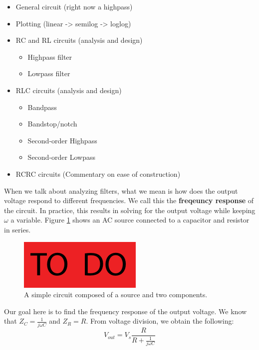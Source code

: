 \begin{itemize}
\item General circuit (right now a highpass)
\item Plotting (linear -> semilog -> loglog)
\item RC and RL circuits (analysis and design)
\begin{itemize}
\item Highpass filter
\item Lowpass filter
\end{itemize}
\item RLC circuits (analysis and design)
\begin{itemize}
\item Bandpass
\item Bandstop/notch
\item Second-order Highpass
\item Second-order Lowpass
\end{itemize}
\item RCRC circuits (Commentary on ease of construction)
\end{itemize}


When we talk about analyzing filters, what we mean is how does the output voltage respond to different frequencies.  We call this the {\bf freqeuncy response} of the circuit.  In practice, this results in solving for the output voltage while keeping $\omega$ a variable.  Figure \ref{fig:CircuitRC} shows an AC source connected to a capacitor and resistor in series.

\begin{figure}
   \centering
  \includegraphics{figures/toDo}
  \caption{A simple circuit composed of a source and two components.}
  \label{fig:CircuitRC}
\end{figure}

Our goal here is to find the frequency response of the output voltage.  We know that $Z_C=\frac{1}{j\omega C}$ and $Z_R = R$.  From voltage division, we obtain the following:
\begin{equation} \label{eq:CircuitLC}
  V_{out} = V_s \frac{R}{R + \frac{1}{j \omega C}}
\end{equation}

